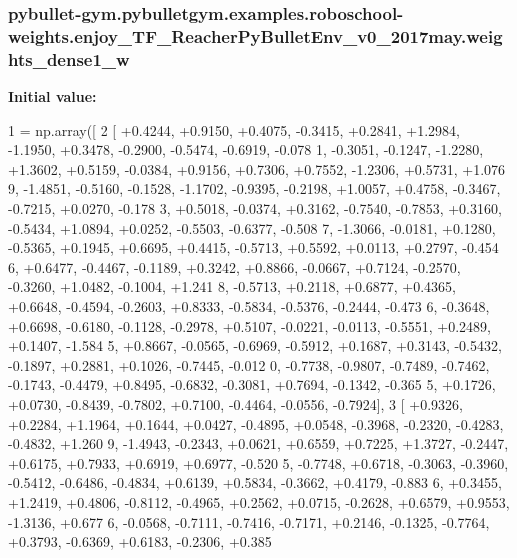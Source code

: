 \subsubsection[{\texorpdfstring{weights\+\_\+dense1\+\_\+w}{weights_dense1_w}}]{\setlength{\rightskip}{0pt plus 5cm}pybullet-\/gym.\+pybulletgym.\+examples.\+roboschool-\/weights.\+enjoy\+\_\+\+T\+F\+\_\+\+Reacher\+Py\+Bullet\+Env\+\_\+v0\+\_\+2017may.\+weights\+\_\+dense1\+\_\+w}\hypertarget{namespacepybullet-gym_1_1pybulletgym_1_1examples_1_1roboschool-weights_1_1enjoy___t_f___reacher_py_bullet_env__v0__2017may_a84169a79cc90b7aa207b0c425270725f}{}\label{namespacepybullet-gym_1_1pybulletgym_1_1examples_1_1roboschool-weights_1_1enjoy___t_f___reacher_py_bullet_env__v0__2017may_a84169a79cc90b7aa207b0c425270725f}
{\bfseries Initial value\+:}
\begin{DoxyCode}
1 = np.array([
2 [ +0.4244, +0.9150, +0.4075, -0.3415, +0.2841, +1.2984, -1.1950, +0.3478, -0.2900, -0.5474, -0.6919, -0.078
      1, -0.3051, -0.1247, -1.2280, +1.3602, +0.5159, -0.0384, +0.9156, +0.7306, +0.7552, -1.2306, +0.5731, +1.076
      9, -1.4851, -0.5160, -0.1528, -1.1702, -0.9395, -0.2198, +1.0057, +0.4758, -0.3467, -0.7215, +0.0270, -0.178
      3, +0.5018, -0.0374, +0.3162, -0.7540, -0.7853, +0.3160, -0.5434, +1.0894, +0.0252, -0.5503, -0.6377, -0.508
      7, -1.3066, -0.0181, +0.1280, -0.5365, +0.1945, +0.6695, +0.4415, -0.5713, +0.5592, +0.0113, +0.2797, -0.454
      6, +0.6477, -0.4467, -0.1189, +0.3242, +0.8866, -0.0667, +0.7124, -0.2570, -0.3260, +1.0482, -0.1004, +1.241
      8, -0.5713, +0.2118, +0.6877, +0.4365, +0.6648, -0.4594, -0.2603, +0.8333, -0.5834, -0.5376, -0.2444, -0.473
      6, -0.3648, +0.6698, -0.6180, -0.1128, -0.2978, +0.5107, -0.0221, -0.0113, -0.5551, +0.2489, +0.1407, -1.584
      5, +0.8667, -0.0565, -0.6969, -0.5912, +0.1687, +0.3143, -0.5432, -0.1897, +0.2881, +0.1026, -0.7445, -0.012
      0, -0.7738, -0.9807, -0.7489, -0.7462, -0.1743, -0.4479, +0.8495, -0.6832, -0.3081, +0.7694, -0.1342, -0.365
      5, +0.1726, +0.0730, -0.8439, -0.7802, +0.7100, -0.4464, -0.0556, -0.7924],
3 [ +0.9326, +0.2284, +1.1964, +0.1644, +0.0427, -0.4895, +0.0548, -0.3968, -0.2320, -0.4283, -0.4832, +1.260
      9, -1.4943, -0.2343, +0.0621, +0.6559, +0.7225, +1.3727, -0.2447, +0.6175, +0.7933, +0.6919, +0.6977, -0.520
      5, -0.7748, +0.6718, -0.3063, -0.3960, -0.5412, -0.6486, -0.4834, +0.6139, +0.5834, -0.3662, +0.4179, -0.883
      6, +0.3455, +1.2419, +0.4806, -0.8112, -0.4965, +0.2562, +0.0715, -0.2628, +0.6579, +0.9553, -1.3136, +0.677
      6, -0.0568, -0.7111, -0.7416, -0.7171, +0.2146, -0.1325, -0.7764, +0.3793, -0.6369, +0.6183, -0.2306, +0.385

\end{DoxyCode}
